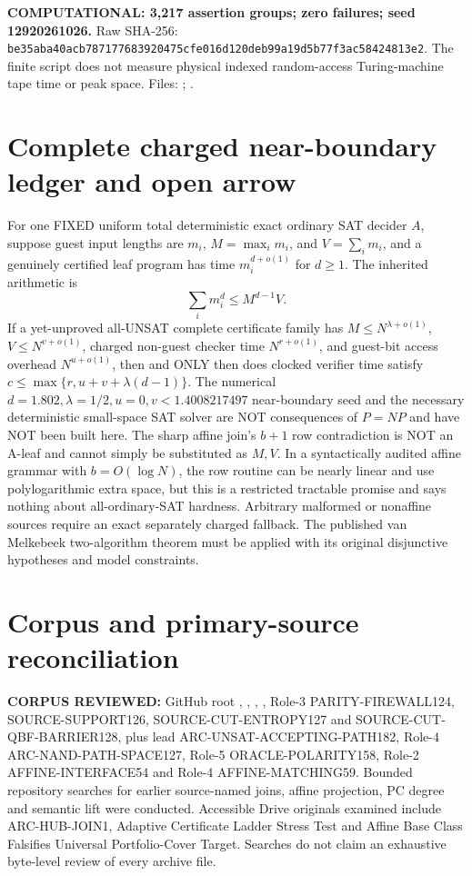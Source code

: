 \documentclass[11pt]{article}
\begin{document}
\textbf{COMPUTATIONAL: 3,217 assertion groups; zero failures; seed 12920261026.}
Raw SHA-256:
\texttt{be35aba40acb787177683920475cfe016d120deb99a19d5b77f3ac58424813e2}.
The finite script does not measure physical indexed random-access Turing-machine tape time or peak space. Files:
;
.

\section{Complete charged near-boundary ledger and open arrow}
For one FIXED uniform total deterministic exact ordinary SAT decider $A$, suppose guest input lengths are $m_i$, $M=\max_i m_i$, and $V=\sum_i m_i$, and a genuinely certified leaf program has time $m_i^{d+o(1)}$ for $d\ge1$. The inherited arithmetic is
\[
\sum_i m_i^d\le M^{d-1}V.
\]
If a yet-unproved all-UNSAT complete certificate family has $M\le N^{\lambda+o(1)}$, $V\le N^{v+o(1)}$, charged non-guest checker time $N^{r+o(1)}$, and guest-bit access overhead $N^{u+o(1)}$, then and ONLY then does clocked verifier time satisfy $c\le\max\{r,u+v+\lambda(d-1)\}$. The numerical $d=1.802,\lambda=1/2,u=0,v<1.4008217497$ near-boundary seed and the necessary deterministic small-space SAT solver are NOT consequences of $P=NP$ and have NOT been built here. The sharp affine join's $b+1$ row contradiction is NOT an A-leaf and cannot simply be substituted as $M,V$. In a syntactically audited affine grammar with $b=O(\log N)$, the row routine can be nearly linear and use polylogarithmic extra space, but this is a restricted tractable promise and says nothing about all-ordinary-SAT hardness. Arbitrary malformed or nonaffine sources require an exact separately charged fallback. The published van Melkebeek two-algorithm theorem must be applied with its original disjunctive hypotheses and model constraints.

\section{Corpus and primary-source reconciliation}
\textbf{CORPUS REVIEWED:} GitHub root , , , , Role-3 PARITY-FIREWALL124, SOURCE-SUPPORT126, SOURCE-CUT-ENTROPY127 and SOURCE-CUT-QBF-BARRIER128, plus lead ARC-UNSAT-ACCEPTING-PATH182, Role-4 ARC-NAND-PATH-SPACE127, Role-5 ORACLE-POLARITY158, Role-2 AFFINE-INTERFACE54 and Role-4 AFFINE-MATCHING59. Bounded repository searches for earlier source-named joins, affine projection, PC degree and semantic lift were conducted. Accessible Drive originals examined include ARC-HUB-JOIN1, Adaptive Certificate Ladder Stress Test and Affine Base Class Falsifies Universal Portfolio-Cover Target. Searches do not claim an exhaustive byte-level review of every archive file.
\end{document}
